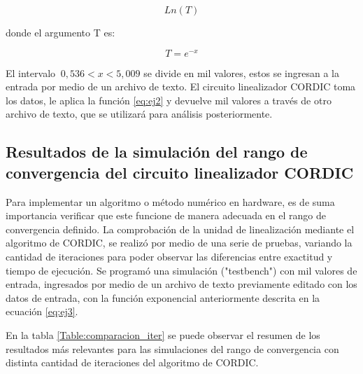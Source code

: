 \begin{equation} \label{eq:ej2}
  Ln \left(T \right) 
\end{equation} 

donde el argumento T es:

\begin{equation} \label{eq:ej3}
   T = e^{-x}         
\end{equation} 
  
El intervalo $\ 0,536 < x < 5,009$ se divide en mil valores, estos se ingresan a la entrada por medio de un archivo de texto. El circuito linealizador CORDIC toma los datos, le aplica la función \ref{eq:ej2} y devuelve mil valores a través de otro archivo de texto, que se utilizará para análisis posteriormente. 
 

\subsection{Resultados de la simulación del rango de convergencia del circuito linealizador CORDIC}

Para implementar un algoritmo o método numérico en hardware, es de suma importancia verificar que este funcione de manera adecuada en el rango de convergencia definido. La comprobación de la unidad de linealización mediante el algoritmo de CORDIC, se realizó por medio de una serie de pruebas, variando la cantidad de iteraciones para poder observar las diferencias entre exactitud y tiempo de ejecución. Se programó una simulación ("testbench") con mil valores de entrada, ingresados por medio de un archivo de texto previamente editado con los datos de entrada, con la función exponencial anteriormente descrita en la ecuación \ref{eq:ej3}. 

En la tabla \ref{Table:comparacion_iter} se puede observar el resumen de los resultados más relevantes para las simulaciones del rango de convergencia con distinta cantidad de iteraciones del algoritmo de CORDIC. 

